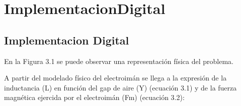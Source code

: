 \chapter{ImplementacionDigital}  \label{cap:Implementacion Digital}

\section{Implementacion Digital}

En la Figura 3.1 se puede observar una representación física del problema.


A partir del modelado físico del electroimán se llega a la expresión de la inductancia (L) en función del gap de aire (Y) (ecuación 3.1) y de la fuerza magnética ejercida por el electroimán (Fm) (ecuación 3.2):


